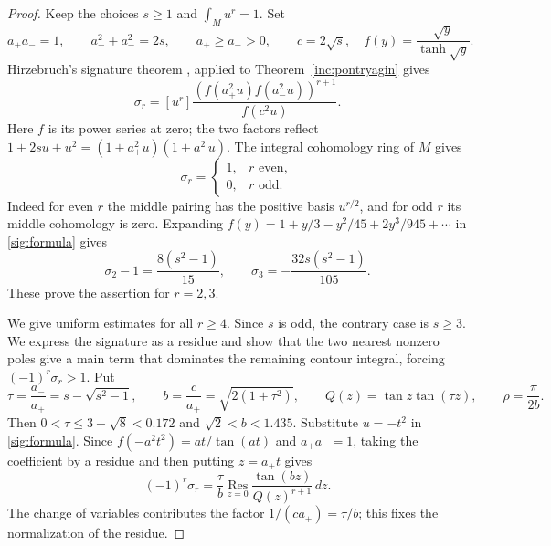\begin{proof}
Keep the choices $s\ge1$ and $\int_Mu^r=1$. Set
\[
 a_+a_-=1,\qquad a_+^2+a_-^2=2s,\qquad
 a_+\ge a_->0,\qquad c=2\sqrt{s},
 \quad f(y)=\frac{\sqrt y}{\tanh\sqrt y}.
\]
Hirzebruch's signature theorem
\citep[Signature Theorem~19.4]{MilnorStasheff1974}, applied to
Theorem~\ref{inc:pontryagin} gives
\begin{equation}\label{sig:formula}
 \sigma_r=[u^r]
 \frac{(f(a_+^2u)f(a_-^2u))^{r+1}}{f(c^2u)}.
\end{equation}
Here $f$ is its power series at zero; the two factors reflect
$1+2su+u^2=(1+a_+^2u)(1+a_-^2u)$.
The integral cohomology ring of $M$ gives
\[
 \sigma_r=\begin{cases}1,&r\text{ even},\\0,&r\text{ odd}.
 \end{cases}
\]
Indeed for even $r$ the middle pairing has the positive basis
$u^{r/2}$, and for odd $r$ its middle cohomology is zero.
Expanding $f(y)=1+y/3-y^2/45+2y^3/945+\cdots$ in
\eqref{sig:formula} gives
\[
 \sigma_2-1=\frac{8(s^2-1)}{15},\qquad
 \sigma_3=-\frac{32s(s^2-1)}{105}.
\]
These prove the assertion for $r=2,3$.

We give uniform estimates for all $r\ge4$. Since $s$ is odd,
the contrary case is $s\ge3$. We express the signature as a residue
and show that the two nearest nonzero poles give a main term that
dominates the remaining contour integral, forcing
$(-1)^r\sigma_r>1$. Put
\[
 \tau=\frac{a_-}{a_+}=s-\sqrt{s^2-1},\qquad
 b=\frac c{a_+}=\sqrt{2(1+\tau^2)},\qquad
 Q(z)=\tan z\tan(\tau z),\qquad \rho=\frac\pi{2b}.
\]
Then $0<\tau\le3-\sqrt8<0.172$ and
$\sqrt2<b<1.435$.
Substitute $u=-t^2$ in \eqref{sig:formula}. Since
$f(-a^2t^2)=at/\tan(at)$ and $a_+a_-=1$, taking the
coefficient by a residue and then putting $z=a_+t$ gives
\begin{equation}\label{sig:residue}
 (-1)^r\sigma_r=
 \frac\tau b\operatorname*{Res}_{z=0}
 \frac{\tan(bz)}{Q(z)^{r+1}}\,dz.
\end{equation}
The change of variables contributes the factor
$1/(ca_+)=\tau/b$; this fixes the normalization of the residue.


\end{proof}
